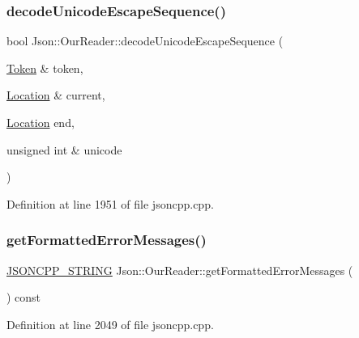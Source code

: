 \subsubsection{\texorpdfstring{decode\+Unicode\+Escape\+Sequence()}{decodeUnicodeEscapeSequence()}}
{\footnotesize\ttfamily bool Json\+::\+Our\+Reader\+::decode\+Unicode\+Escape\+Sequence (\begin{DoxyParamCaption}\item[{\hyperlink{class_json_1_1_our_reader_1_1_token}{Token} \&}]{token,  }\item[{\hyperlink{class_json_1_1_our_reader_a1bdc7bbc52ba87cae6b19746f2ee0189}{Location} \&}]{current,  }\item[{\hyperlink{class_json_1_1_our_reader_a1bdc7bbc52ba87cae6b19746f2ee0189}{Location}}]{end,  }\item[{unsigned int \&}]{unicode }\end{DoxyParamCaption})\hspace{0.3cm}{\ttfamily [private]}}



Definition at line 1951 of file jsoncpp.\+cpp.

\hypertarget{class_json_1_1_our_reader_a7971de51d73bb4aee5b0c4742c4aaaac}{}\label{class_json_1_1_our_reader_a7971de51d73bb4aee5b0c4742c4aaaac} 
\subsubsection{\texorpdfstring{get\+Formatted\+Error\+Messages()}{getFormattedErrorMessages()}}
{\footnotesize\ttfamily \hyperlink{config_8h_a1e723f95759de062585bc4a8fd3fa4be}{J\+S\+O\+N\+C\+P\+P\+\_\+\+S\+T\+R\+I\+NG} Json\+::\+Our\+Reader\+::get\+Formatted\+Error\+Messages (\begin{DoxyParamCaption}{ }\end{DoxyParamCaption}) const}



Definition at line 2049 of file jsoncpp.\+cpp.

\hypertarget{class_json_1_1_our_reader_af482c8e718615646e13a996292e18d74}{}\label{class_json_1_1_our_reader_af482c8e718615646e13a996292e18d74} 
